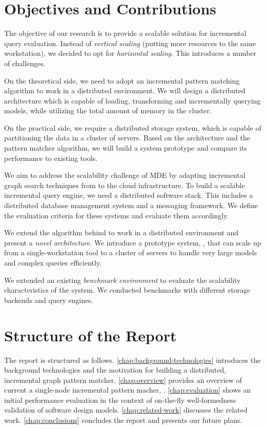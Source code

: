 \section{Objectives and Contributions}


The objective of our research is to provide a scalable solution for incremental query evaluation. Instead of \emph{vertical scaling} (putting more resources to the same workstation), we decided to opt for \emph{horizontal scaling}. This introduces a number of challenges.

On the theoretical side, we need to adopt an incremental pattern matching algorithm to work in a distributed environment. We will design a distributed architecture which is capable of loading, transforming and incrementally querying models, while utilizing the total amount of memory in the cluster.

On the practical side, we require a distributed storage system, which is capable of partitioning the data in a cluster of servers. Based on the architecture and the pattern matcher algorithm, we will build a system prototype and compare its performance to existing tools.

We aim to address the scalability challenge of MDE by adapting incremental graph search techniques from \eiq{} to the cloud infrastructure. To build a scalable incremental query engine, we need a distributed software stack. This includes a distributed database management system and a messaging framework. We define the evaluation criteria for these systems and evaluate them accordingly.

We extend the algorithm behind \eiq{} to work in a distributed environment and present a \emph{novel architecture}. We introduce a prototype system, \iqd{}, that can scale up from a single-workstation tool to a cluster of servers to handle very large models and complex queries efficiently. 

We extended an existing \emph{benchmark environment} to evaluate the scalability characteristics of the system. We conducted benchmarks with different storage backends and query engines.

\section{Structure of the Report}
 
The report is structured as follows. 
\autoref{chap:background-technologies} introduces the background technologies and the motivation for building a distributed, incremental graph pattern matcher. \autoref{chap:overview} provides an overview of current a single-node incremental pattern macher, \eiq{}. 
\autoref{chap:evaluation} shows an initial performance evaluation in the context of on-the-fly well-formedness validation of software design models. 
\autoref{chap:related-work} discusses the related work. \autoref{chap:conclusions} concludes the report and presents our future plans. 

